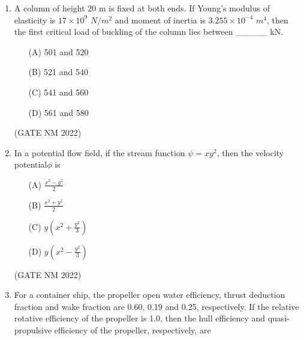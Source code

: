 \documentclass[journal,12pt,onecolumn]{IEEEtran}
\theoremstyle{remark}
\begin{document}
\begin{enumerate}
\item  A column of height $20$ m  is fixed at both ends.  
If Young's modulus of elasticity is $17 \times 10^{9}$ $ N/m^2 $ and moment of inertia is $3.255 \times  10^{-4}$ $ m^4 $, then the first critical load of buckling of the column lies between \_\_\_\_\_ kN.

\begin{multicols}{4}

\begin{enumerate}
    \item[(A)] 501 and 520
    \item[(B)] 521 and 540
    \item[(C)] 541 and 560
    \item[(D)] 561 and 580
\end{enumerate}

\end{multicols}

\hfill(GATE NM 2022)










\item  In a potential flow field, if the stream function $\psi = x y^2$, then the velocity potential$\phi$ is

	\begin{multicols}{2}

\begin{enumerate}
	\item[(A)] $\frac{x^2 - y^2}{2} $
	\item[(B)] $\frac{x^2 + y^2}{2} $
	\item[(C)] $y(x^2 + \frac{y^2}{3}) $
	\item[(D)] $y(x^2 - \frac{y^2}{3}) $
\end{enumerate}

	\end{multicols}

\hfill(GATE NM 2022)










\item  For a container ship, the propeller open water efficiency, thrust deduction fraction and wake fraction are 0.60, 0.19 and 0.25, respectively.  
If the relative rotative efficiency of the propeller is 1.0, then the hull efficiency and quasi-propulsive efficiency of the propeller, respectively, are


\end{enumerate}
\end{document}
